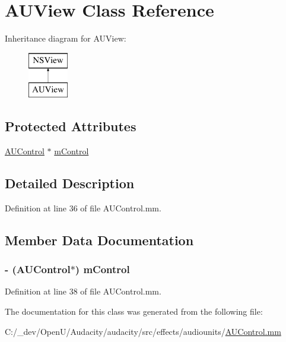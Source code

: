 \hypertarget{interface_a_u_view}{}\section{A\+U\+View Class Reference}
\label{interface_a_u_view}
Inheritance diagram for A\+U\+View\+:\begin{figure}[H]
\begin{center}
\leavevmode
\includegraphics[height=2.000000cm]{interface_a_u_view}
\end{center}
\end{figure}
\subsection*{Protected Attributes}
\begin{DoxyCompactItemize}
\item 
\hyperlink{class_a_u_control}{A\+U\+Control} $\ast$ \hyperlink{interface_a_u_view_a804930b632a3f80ae4310dfe8812a12b}{m\+Control}
\end{DoxyCompactItemize}


\subsection{Detailed Description}


Definition at line 36 of file A\+U\+Control.\+mm.



\subsection{Member Data Documentation}
\subsubsection[{\texorpdfstring{m\+Control}{mControl}}]{\setlength{\rightskip}{0pt plus 5cm}-\/ ({\bf A\+U\+Control}$\ast$) m\+Control\hspace{0.3cm}{\ttfamily [protected]}}\hypertarget{interface_a_u_view_a804930b632a3f80ae4310dfe8812a12b}{}\label{interface_a_u_view_a804930b632a3f80ae4310dfe8812a12b}


Definition at line 38 of file A\+U\+Control.\+mm.



The documentation for this class was generated from the following file\+:\begin{DoxyCompactItemize}
\item 
C\+:/\+\_\+dev/\+Open\+U/\+Audacity/audacity/src/effects/audiounits/\hyperlink{_a_u_control_8mm}{A\+U\+Control.\+mm}\end{DoxyCompactItemize}
